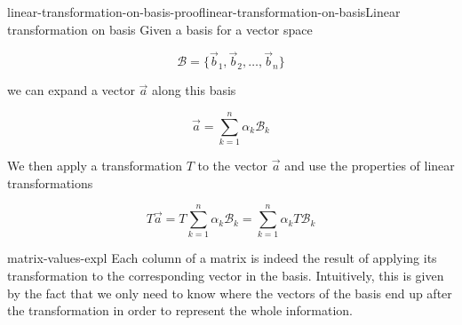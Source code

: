 \documentclass[preview]{standalone}
\begin{document}
\begin{snippetproof}{linear-transformation-on-basis-proof}{linear-transformation-on-basis}{Linear transformation on basis}
    Given a basis for a vector space

    \[
        \mathcal{B}=\{\vec{b}_1, \vec{b}_2, \ldots, \vec{b}_n\}
    \]
    
    we can expand a vector \(\vec{a}\) along this basis
    
    \[
        \vec{a} = \sum_{k=1}^{n} \alpha_k \mathcal{B}_k
    \]
    
    We then apply a transformation \(T\) to the vector \(\vec{a}\) and use the properties of
    linear transformations
    
    \[
        T\vec{a}
        = T\sum_{k=1}^{n} \alpha_k \mathcal{B}_k
        = \sum_{k=1}^{n} \alpha_k T\mathcal{B}_k
    \]
\end{snippetproof}

\begin{snippet}{matrix-values-expl}
    Each column of a matrix is indeed the result of applying its transformation
    to the corresponding vector in the basis.
    Intuitively, this is given by the fact that we only need to know where the vectors of the basis
    end up after the transformation in order to represent the whole information.
\end{snippet}
\end{document}
